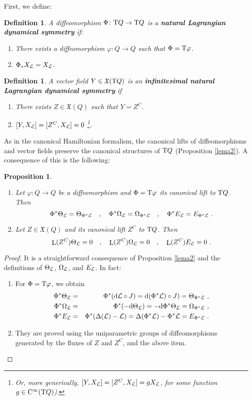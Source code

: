 \documentclass[12pt]{report}
\newtheorem{prop}[teor]{Proposition}
\newtheorem{definition}[teor]{Definition}
\def\beann{\begin{eqnarray*}}
\def\eeann{\end{eqnarray*}}
\def\ben{\begin{enumerate}}
\def\een{\end{enumerate}}
\def\qed{\ifvmode\removelastskip\fi
{\unskip\nobreak\hfil\penalty50\hbox{}\nobreak\hfil
\hbox{\vrule height1.2ex width1.2ex}\parfillskip=0pt
\finalhyphendemerits=0 \par\smallskip}}
\def\vf{\mathfrak X}
\def\Lag{{\cal L}}
\def\d{{\rm d}}
\def\Tan{{\rm T}}
\def\Lie{\mathop{\rm L}\nolimits}
\def\Cinfty{{\rm C}^\infty}
\begin{document}
First, we define:

\begin{definition}
A diffeomorphism $\Phi\colon\Tan Q\to \Tan Q$ is a
\textbf{natural Lagrangian dynamical symmetry} if:
\ben
\item
There exists a diffeomorphism $\varphi\colon Q\to Q$ such that $\Phi=\Tan\varphi$.
\item
$\Phi_*X_\Lag=X_\Lag$.
\een
\label{dls}
\end{definition}

\begin{definition}
A vector field $Y\in\vf(\Tan Q)$ is an
\textbf{ infinitesimal natural Lagrangian dynamical symmetry} if
\ben
\item
There exists $Z\in\vf (Q)$ such that $Y=Z^{C}$.
 \item
$[Y,X_\Lag]=[Z^{C},X_\Lag]=0$
\footnote{
Or, more generically,
$[Y,X_\Lag]=[Z^{C},X_\Lag]=gX_\Lag$, for some function $g\in\Cinfty(\Tan Q)$).}.
\een
\label{dlsinf}
\end{definition}

As in the canonical Hamiltonian formalism,
the canonical lifts of diffeomorphisms and vector fields
preserve  the canonical structures of $\Tan Q$ (Proposition \ref{lema2}).
A consequence of this is the following:

\begin{prop}
\label{lema3}
\ben
\item
 Let $\varphi\colon Q\to Q$ be a diffeomorphism and
$\Phi=\Tan\varphi$ its canonical lift to $\Tan Q$. Then
$$
\Phi^*\Theta_\Lag=\Theta_{\Phi^*\Lag} \quad ,\quad
\Phi^*\Omega_\Lag=\Omega_{\Phi^*\Lag} \quad ,\quad
\Phi^*E_\Lag=E_{\Phi^*\Lag} \ .
$$
\item
Let $Z\in\vf (Q)$ and its canonical lift $Z^C$ to $\Tan Q$. Then
$$
\Lie(Z^C)\Theta_\Lag=0 \quad , \quad
\Lie(Z^C)\Omega_\Lag=0 \quad , \quad
\Lie(Z^C)E_\Lag=0 \ .
$$
\een
\end{prop}
\begin{proof}
It is a straightforward consequence of Proposition \ref{lema2} and the
definitions of  $\Theta_\Lag$, $\Omega_\Lag$, and $E_\Lag$.
In fact:
\ben
\item
For $\Phi=\Tan\varphi$, we obtain
 \beann
 \Phi^*\Theta_\Lag&=& \Phi^*(\d \Lag\circ J)=\d (\Phi^*\Lag)\circ J)=\Theta_{\Phi^*\Lag} \ ,
\\
\Phi^*\Omega_\Lag&=&\Phi^*(-\d\Theta_\Lag)=-\d\Phi^*\Theta_\Lag=\Omega_{\Phi^*\Lag} \ ,
 \\
\Phi^*E_\Lag&=&\Phi^*(\Delta(\Lag)-\Lag)=\Delta(\Phi^*\Lag)-\Phi^*\Lag=E_{\Phi^*\Lag} \ .
\eeann
\item
They are proved using the uniparametric groups of diffeomorphisms generated by
 the fluxes of $Z$ and $Z^C$, and the above item.
 \een
 \qed \end{proof}
\end{document}
